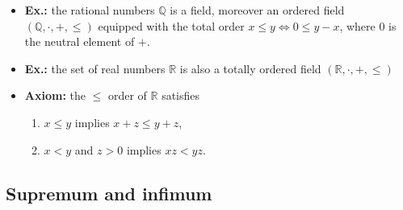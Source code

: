 \documentclass{article}
\begin{document}
\begin{itemize}
\item \textbf{Ex.:} the rational numbers $\mathbb{Q}$ is a field, moreover an ordered field $(\mathbb{Q}, \cdot, +, \leq)$ equipped with the total order $x\leq y\iff0\leq y-x$, where 0 is the neutral element of $+$.

\item \textbf{Ex.:} the set of real numbers $\mathbb{R}$ is also a totally ordered field $(\mathbb{R}, \cdot, +, \leq)$

\item \textbf{Axiom:} the $\leq$ order of $\mathbb{R}$ satisfies
\begin{enumerate}[label=\Roman*.]
  \item $x\leq y$ implies $x+z\leq y+z$,
  \item $x< y$ and $z>0$ implies $xz<yz$.
\end{enumerate}
\end{itemize}
\subsection{Supremum and infimum}
\end{document}
